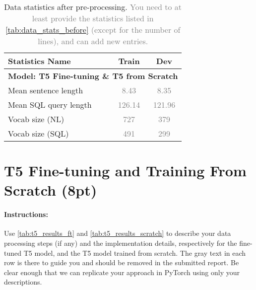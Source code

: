 \documentclass{article}
\begin{document}
\begin{table}[h!]
\centering
\begin{tabular}{lcc}
\toprule
Statistics Name & Train & Dev \\
\midrule
\multicolumn{3}{l}{\textbf{Model: T5 Fine-tuning \& T5 from Scratch}} \\ %
Mean sentence length & \textcolor{gray}{8.43}& \textcolor{gray}{8.35} \\
Mean SQL query length & \textcolor{gray}{126.14}& \textcolor{gray}{121.96} \\
Vocab size (NL) & \textcolor{gray}{727}& \textcolor{gray}{379} \\
Vocab size (SQL) & \textcolor{gray}{491}& \textcolor{gray}{299} \\
\bottomrule
\end{tabular}
\caption{Data statistics after pre-processing. \textcolor{gray}{You need to at least provide the statistics listed in \autoref{tab:data_stats_before} (except for the number of lines), and can add new entries.}}
\label{tab:data_stats_after}
\end{table}



\newpage




\section{T5 Fine-tuning and Training From Scratch (8pt)}\label{sec:t5}
\paragraph{Instructions:} Use \autoref{tab:t5_results_ft} and \autoref{tab:t5_results_scratch} to describe your data processing steps (if any) and the implementation details, respectively for the fine-tuned T5 model, and the T5 model trained from scratch.
The gray text in each row is there to guide you and should be removed in the submitted report. 
Be clear enough that we can replicate your approach in PyTorch using only your descriptions.
\end{document}
